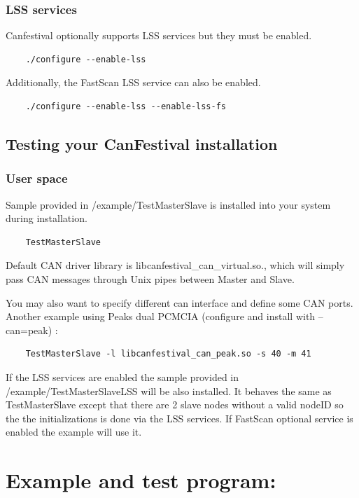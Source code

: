 \documentclass[12pt,english,a4paper]{book}
\begin{document}
\subsubsection{LSS services}
Canfestival optionally supports LSS services but they must be enabled.
\begin{verbatim}
	./configure --enable-lss
\end{verbatim}

Additionally, the FastScan LSS service can also be enabled.
\begin{verbatim}
	./configure --enable-lss --enable-lss-fs
\end{verbatim}

\subsection{Testing your CanFestival installation}

\subsubsection{User space}

Sample provided in /example/TestMasterSlave is installed into your
system during installation.


\begin{verbatim}
	TestMasterSlave
\end{verbatim}


Default CAN driver library is libcanfestival\_can\_virtual.so., which
will simply pass CAN messages through Unix pipes between Master and
Slave.

You may also want to specify different can interface and define some
CAN ports. Another example using Peak{\textquotesingle}s dual PCMCIA
(configure and install with --can=peak) :


\begin{verbatim}
	TestMasterSlave -l libcanfestival_can_peak.so -s 40 -m 41
\end{verbatim}

If the LSS services are enabled the sample provided in /example/TestMasterSlaveLSS will be also installed. It behaves the same as TestMasterSlave except that there are 2 slave nodes without a valid nodeID so the the initializations is done via  the LSS services. If FastScan optional service is enabled the example will use it. 

\section{Example and test program:}
\end{document}

